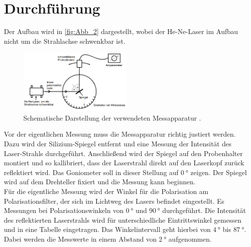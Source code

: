 \section{Durchführung}
\label{sec:Durchführung}
Der Aufbau wird in \autoref{fig:Abb_2} dargestellt, wobei der He-Ne-Laser im Aufbau nicht um die Strahlachse schwenkbar ist.
\begin{figure}[H]
    \centering
    \includegraphics[width=0.5\textwidth]{Abbildung/Abb_2.png}
    \caption {Schematische Darstellung der verwendeten Messapparatur \cite{V407}.}
    \label{fig:Abb_2}
\end{figure}
Vor der eigentlichen Messung muss die Messapparatur richtig justiert werden. Dazu wird der 
Silizium-Spiegel entfernt und eine Messung der Intensität des Laser-Strahls durchgeführt.
Anschließend wird der Spiegel auf den Probenhalter montiert und so kallibriert, dass der Laserstrahl
direkt auf den Laserkopf zurück reflektiert wird. Das Goniometer soll in dieser 
Stellung auf $\qty{0}{\degree}$ zeigen. Der Spiegel wird auf dem Drehteller fixiert und die Messung kann beginnen.\\
Für die eigentliche Messung wird der Winkel für die Polarisation am Polarisationsfilter, der sich im Lichtweg des Lasers befindet eingestellt.
Es Messungen bei Polarisationswinkeln von $\qty{0}{\degree}$ und $\qty{90}{\degree}$  durchgeführt.
Die Intensität des reflektierten Laserstrahls wird für unterschiedliche Eintrittswinkel gemessen und 
in eine Tabelle eingetragen. Das Winkelintervall geht hierbei von $\qty{4}{\degree}$ bis $\qty{87}{\degree}$.
Dabei werden die Messwerte in einem Abstand von $\qty{2}{\degree}$ aufgenommen.